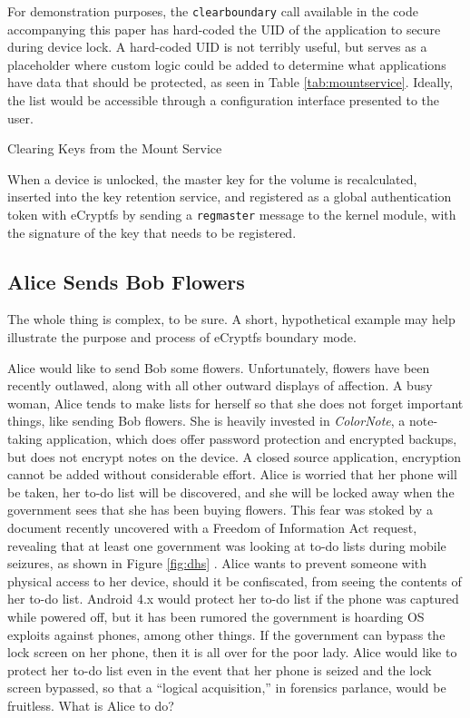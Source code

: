 For demonstration purposes, the \texttt{clearboundary} call available in the code accompanying this paper has hard-coded the UID of
the application to secure during device lock. A hard-coded UID is not terribly useful, but serves as a placeholder where custom
logic could be added to determine what applications have data that should be protected, as seen in Table \ref{tab:mountservice}.
Ideally, the list would be accessible through a configuration interface presented to the user.

\begin{table}[!htb]

\caption{Clearing Keys from the Mount Service}
\label{tab:mountservice}
\end{table}

When a device is unlocked, the master key for the volume is recalculated, inserted into the key retention service, and registered
as a global authentication token with eCryptfs by sending a \texttt{regmaster} message to the kernel module, with the signature of
the key that needs to be registered. 

\subsection{Alice Sends Bob Flowers}
\label{sec:alicebob}
The whole thing is complex, to be sure. A short, hypothetical example may help illustrate the purpose and process of eCryptfs boundary mode.  

Alice would like to send Bob some flowers. Unfortunately, flowers have been recently outlawed, along with all other outward displays
of affection. A busy woman, Alice tends to make lists for herself so that she does not forget important things, like sending Bob
flowers. She is heavily invested in \emph{ColorNote}, a note-taking application, which does offer password protection and encrypted
backups, but does not encrypt notes on the device. A closed source application, encryption cannot be added without considerable
effort. Alice is worried that her phone will be taken, her to-do list will be discovered, and she will be locked away when the
government sees that she has been buying flowers. This fear was stoked by a document recently uncovered with a Freedom of
Information Act request, revealing that at least one government was looking at to-do lists during mobile seizures, as shown in
Figure \ref{fig:dhs} \cite{dhsfoia}. Alice wants to prevent someone with physical access to her device, should it be confiscated,
from seeing the contents of her to-do list. Android 4.x would protect her to-do list if the phone was captured while powered off, but
it has been rumored the government is hoarding OS exploits against phones, among other things. If the government can bypass the lock
screen on her phone, then it is all over for the poor lady. Alice would like to protect her to-do list even in the event that her
phone is seized and the lock screen bypassed, so that a ``logical acquisition,'' in forensics parlance, would be fruitless.
What is Alice to do?

